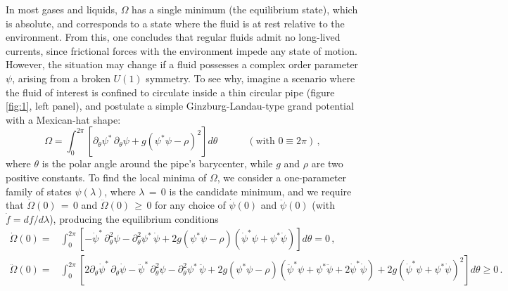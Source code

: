 \documentclass[a4paper, amsfonts, amssymb, amsmath, reprint, showkeys, nofootinbib, twoside,notitlepage,onecolumn]{revtex4-2}
\newcommand{\spc}{\quad \quad \quad}
\theoremstyle{definition}
\theoremstyle{theorem}
\theoremstyle{corollary}
\begin{document}
In most gases and liquids, $\Omega$ has a single minimum (the equilibrium state), which is absolute, and corresponds to a state where the fluid is at rest relative to the environment. From this, one concludes that regular fluids admit no long-lived currents, since frictional forces with the environment impede any state of motion. However, the situation may change if a fluid possesses a complex order parameter $\psi$, arising from a broken $U(1)$ symmetry. To see why, imagine a scenario where the fluid of interest is confined to circulate inside a thin circular pipe (figure \ref{fig:1}, left panel), and postulate a simple Ginzburg-Landau-type grand potential with a Mexican-hat shape:
\vspace{-0.2cm}
\begin{equation}\label{grandone}
\Omega = \int_0^{2\pi} \left[\partial_\theta \psi^* \, \partial_\theta \psi +g (\psi^* \psi -\rho)^2\right] d\theta \spc (\text{with }0\equiv 2\pi) \, ,   
\end{equation}
where $\theta$ is the polar angle around the pipe's barycenter, while $g$ and $\rho$ are two positive constants. To find the local minima of $\Omega$, we consider a one-parameter family of states $\psi(\lambda)$, where $\lambda\,{=}\,0$ is the candidate minimum, and we require that $\dot{\Omega}(0)\,{=}\,0$ and $\ddot{\Omega}(0)\,{\geq}\, 0$ for any choice of $\dot{\psi}(0)$ and $\ddot{\psi}(0)$ (with $\dot{f}=df/d\lambda$), producing the equilibrium conditions
\vspace{-0.2cm}
\begin{equation}
\begin{split}
\dot{\Omega}(0)={}& \int_0^{2\pi} \left[- \dot{\psi}^* \, \partial^2_\theta \psi-\partial_\theta^2 \psi^* \,  \dot{\psi} +2g (\psi^* \psi -\rho)(\dot{\psi}^* \psi+\psi^* \dot{\psi})\right] d\theta =0 \, , \\
\ddot{\Omega}(0)={}& \int_0^{2\pi} \left[2\partial_\theta \dot{\psi}^* \, \partial_\theta \dot{\psi} - \ddot{\psi}^* \, \partial^2_\theta \psi-\partial_\theta^2 \psi^* \,  \ddot{\psi} +2g (\psi^* \psi -\rho)(\ddot{\psi}^* \psi+\psi^* \ddot{\psi}+2\dot{\psi}^* \dot{\psi})+2g(\dot{\psi}^* \psi+\psi^* \dot{\psi})^2\right] d\theta \geq 0 \, .\\
\end{split}
\end{equation}
\newpage
\end{document}

